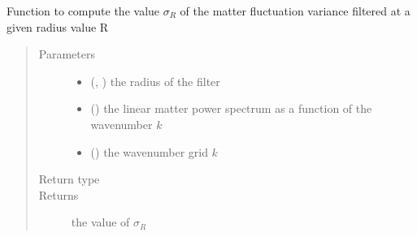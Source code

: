 \documentclass[letterpaper,10pt,english]{sphinxmanual}
\begin{document}
\begin{fulllineitems}
\begin{fulllineitems}
\begin{quote}
\begin{description}
\end{description}\end{quote}

\end{fulllineitems}


\begin{fulllineitems}
\label{\detokenize{api/seyfert.cosmology.cosmology.Cosmology:seyfert.cosmology.cosmology.Cosmology.sigmaR}}
\sphinxAtStartPar
Function to compute the value \(\sigma_R\) of the matter fluctuation variance filtered at a given
radius value R
\begin{quote}\begin{description}
\item[{Parameters}] \leavevmode\begin{itemize}
\item {} 
\sphinxAtStartPar
{} (\sphinxcode{\sphinxupquote{Union}}{[}, \sphinxcode{\sphinxupquote{float}}{]}) \textendash{} the radius of the filter

\item {} 
\sphinxAtStartPar
{} () \textendash{} the linear matter power spectrum as a function of the wavenumber \(k\)

\item {} 
\sphinxAtStartPar
{} () \textendash{} the wavenumber grid \(k\)

\end{itemize}

\item[{Return type}] \leavevmode
\sphinxAtStartPar
{}

\item[{Returns}] \leavevmode
\sphinxAtStartPar
the value of \(\sigma_R\)

\end{description}\end{quote}

\end{fulllineitems}


\end{fulllineitems}
\end{document}
